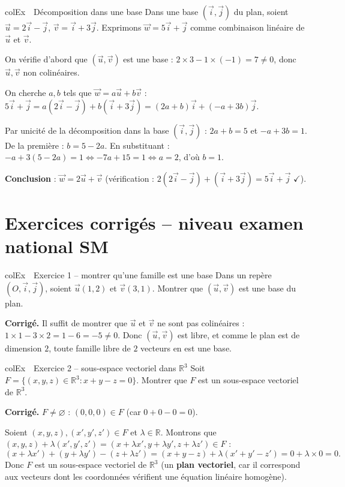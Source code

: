 \documentclass[11pt,a4paper]{article}
\newenvironment{exemple}[1][Exemple]
  {\begin{fiche}{colEx}{\ding{217}~~#1}}{\end{fiche}}
\begin{document}
\begin{exemple}[Décomposition dans une base]
Dans une base $(\vec i,\vec j)$ du plan, soient $\vec u=2\vec i-\vec j$, $\vec v=\vec i+3\vec j$. Exprimons $\vec w=5\vec i+\vec j$ comme combinaison linéaire de $\vec u$ et $\vec v$.

\smallskip
On vérifie d'abord que $(\vec u,\vec v)$ est une base : $2\times3-1\times(-1)=7\ne0$, donc $\vec u,\vec v$ non colinéaires.

\smallskip
On cherche $a,b$ tels que $\vec w=a\vec u+b\vec v$ : $5\vec i+\vec j=a(2\vec i-\vec j)+b(\vec i+3\vec j)=(2a+b)\vec i+(-a+3b)\vec j$.

\smallskip
Par unicité de la décomposition dans la base $(\vec i,\vec j)$ : $2a+b=5$ et $-a+3b=1$. De la première : $b=5-2a$. En substituant : $-a+3(5-2a)=1\iff-7a+15=1\iff a=2$, d'où $b=1$.

\smallskip
\textbf{Conclusion} : $\vec w=2\vec u+\vec v$ (vérification : $2(2\vec i-\vec j)+(\vec i+3\vec j)=5\vec i+\vec j$ $\checkmark$).
\end{exemple}

\section{Exercices corrigés -- niveau examen national SM}

\begin{exemple}[Exercice 1 -- montrer qu'une famille est une base]
Dans un repère $(O,\vec i,\vec j)$, soient $\vec u(1,2)$ et $\vec v(3,1)$. Montrer que $(\vec u,\vec v)$ est une base du plan.

\smallskip
\textbf{Corrigé.} Il suffit de montrer que $\vec u$ et $\vec v$ ne sont pas colinéaires : $1\times1-3\times2=1-6=-5\ne0$. Donc $(\vec u,\vec v)$ est libre, et comme le plan est de dimension $2$, toute famille libre de $2$ vecteurs en est une base.
\end{exemple}

\begin{exemple}[Exercice 2 -- sous-espace vectoriel dans $\mathbb{R}^3$]
Soit $F=\{(x,y,z)\in\mathbb{R}^3 : x+y-z=0\}$. Montrer que $F$ est un sous-espace vectoriel de $\mathbb{R}^3$.

\smallskip
\textbf{Corrigé.} $F\ne\varnothing$ : $(0,0,0)\in F$ (car $0+0-0=0$).

\smallskip
Soient $(x,y,z),(x',y',z')\in F$ et $\lambda\in\mathbb{R}$. Montrons que $(x,y,z)+\lambda(x',y',z')=(x+\lambda x',y+\lambda y',z+\lambda z')\in F$ :
\[
  (x+\lambda x')+(y+\lambda y')-(z+\lambda z') = (x+y-z)+\lambda(x'+y'-z') = 0+\lambda\times0 = 0.
\]
Donc $F$ est un sous-espace vectoriel de $\mathbb{R}^3$ (un \textbf{plan vectoriel}, car il correspond aux vecteurs dont les coordonnées vérifient une équation linéaire homogène).
\end{exemple}
\end{document}
